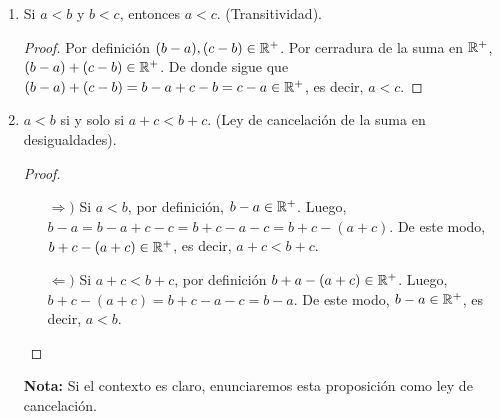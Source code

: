 \begin{enumerate}[label=\alph*)]
 \item Si $a<b$ y $b<c$, entonces $a<c$. (Transitividad).
 \begin{proof} 
  Por definición $(b-a) , (c-b) \in \mathbb{R}^+$. Por cerradura de la suma en $\mathbb{R}^+$, $(b-a) + (c-b) \in \mathbb{R}^+$. De donde sigue que $(b-a)+(c-b)=b-a+c-b=c-a\in \mathbb{R}^+$, es decir, $a<c$.
 \end{proof}

 \item $a<b$ si y solo si $a+c<b+c$. (Ley de cancelación de la suma en desigualdades).
 
 \begin{proof} \leavevmode
 \begin{itemize}
  \item[$\Rightarrow)$] Si $a<b$, por definición, $b-a \in \mathbb{R}^+$. Luego, $b-a=b-a+c-c=b+c-a-c=b+c-(a+c)$. De este modo, $b+c-(a+c)\in \mathbb{R}^+$, es decir, $a+c<b+c$.
  \item[$\Leftarrow)$] Si $a+c<b+c$, por definición $b+a-(a+c)\in \mathbb{R}^+$. Luego, $b+c-(a+c)=b+c-a-c=b-a$. De este modo, $b-a\in \mathbb{R}^+$, es decir, $a<b$. \qedhere
  \end{itemize} 
 \end{proof}
 \textbf{Nota:} Si el contexto es claro, enunciaremos esta proposición como ley de cancelación.


\end{enumerate}
